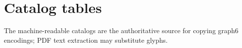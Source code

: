 \documentclass[11pt]{amsart}
\theoremstyle{definition}
\begin{document}
\appendix
\section{Catalog tables}
The machine-readable catalogs are the authoritative source for copying
graph6 encodings; PDF text extraction may substitute glyphs.





\end{document}

